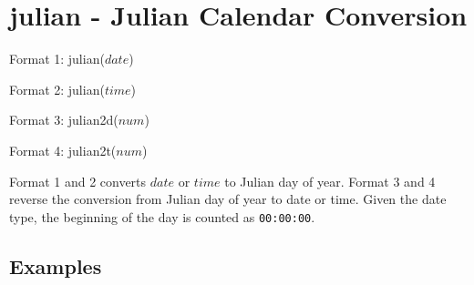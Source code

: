 
%

\section{julian - Julian Calendar Conversion\label{sect:julian}}

Format 1: julian($date$)

Format 2: julian($time$)

Format 3: julian2d($num$)

Format 4: julian2t($num$)

Format 1 and 2 converts $date$ or $time$ to Julian day of year. Format 3 and 4 reverse the conversion from Julian day of year to date or time. Given the date type, the beginning of the day is counted as \verb|00:00:00|.  


\subsection*{Examples}


%

